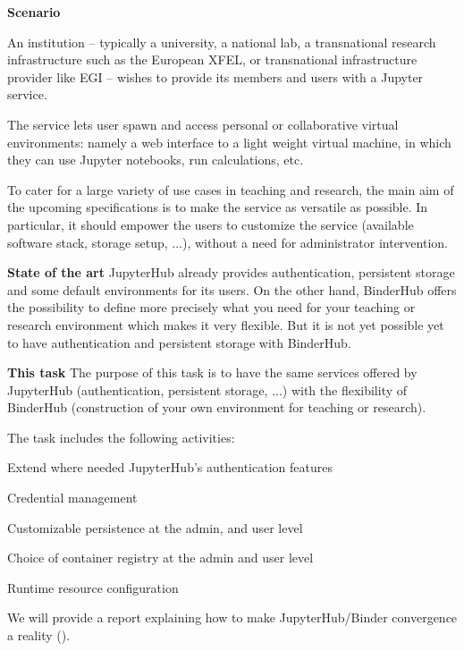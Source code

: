 \begin{task}[
  title=JupyterHub / BinderHub convergence,
  id=jh-bh-conv,
  lead=EP,
  PM=16, %
  wphases={0-36},
  partners={WTT}]

  \textbf{Scenario}

  An institution -- typically a university, a national lab, a transnational
  research infrastructure such as the European XFEL, or transnational 
  infrastructure provider like EGI -- wishes to provide its members and
  users with a Jupyter service.

  The service lets user spawn and access personal or collaborative virtual
  environments: namely a web interface to a light weight virtual machine,
  in which they can use Jupyter notebooks, run calculations, etc.

  To cater for a large variety of use cases in teaching and research,
  the main aim of the upcoming specifications is to make the service as
  versatile as possible. In particular, it should empower the users to 
  customize the service (available software stack, storage setup, ...),
  without a need for administrator intervention.

  \textbf{State of the art}
  JupyterHub already provides authentication, persistent storage and some
  default environments for its users. On the other hand, BinderHub offers
  the possibility to define more precisely what you need for your teaching
  or research environment which makes it very flexible. But
  it is not yet possible yet to have authentication and persistent storage with
  BinderHub.

  \textbf{This task}
  The purpose of this task is to have the same services offered by JupyterHub
  (authentication, persistent storage, ...) with the flexibility of BinderHub
  (construction of your own environment for teaching or research).

  The task includes the following activities:
  \begin{compactitem}
  \item Extend where needed JupyterHub's authentication features%
  \item Credential management
  \item Customizable persistence at the admin, and user level
  \item Choice of container registry at the admin and user level %
  \item Runtime resource configuration %
  \end{compactitem}
  We will provide a report explaining how to make JupyterHub/Binder convergence a reality ().
\end{task}

